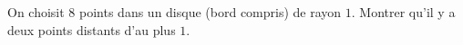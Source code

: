 On choisit $8$ points dans un disque (bord compris) de rayon $1$. Montrer qu'il y a deux
points distants d'au plus $1$.
